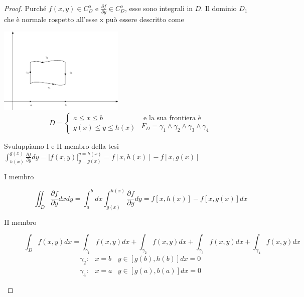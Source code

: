 \begin{proof}
	Purché $f(x,y)\in C_D^o$ e $\frac{\partial f}{\partial y}\in C_D^o$, esse
	sono integrali in $D$. Il dominio $D_1$ che è normale rospetto all'esse x
	può essere descritto come
	\begin{multicols}{2}
		\includegraphics[width=6cm]{img/finiti/secondalegge.eps}\\
		\begin{equation*}
			D=\begin{cases}
				a\leq x\leq b\\
				g(x)\leq y\leq h(x)
			\end{cases}\begin{matrix}
				\text{ e la sua frontiera è}\\
				F_D=\gamma_1\wedge \gamma_2 \wedge \gamma_3 \wedge \gamma_4
			\end{matrix}
		\end{equation*}
	\end{multicols}
	Svuluppiamo I e II membro della tesi $\int_{h(x)}^{g(x)}\frac{\partial
	f}{\partial y} dy=|f(x,y)|^{y=h(x)}_{y=g(x)}=f[x,h(x)]-f[x,g(x)]$
	\begin{description}
		\item[I membro]
			\begin{equation*}
				\iint_D \frac{\partial f}{\partial y} dx dy=\int_{a}^{b} dx
				\int_{g(x)}^{h(x)}\frac{\partial f}{\partial y} dy=
				f[x,h(x)]-f[x,g(x)]dx
			\end{equation*}
		\item[II membro]
			\begin{equation*}
				\int_D f(x, y) dx = \int_{\gamma_1} f(x,y)dx+\int_{\gamma_2}
				f(x,y)dx+\int_{\gamma_3} f(x,y)dx+\int_{\gamma_4} f(x,y)dx
			\end{equation*}
			\begin{equation*}
				\begin{matrix}
					\gamma_2: &x=b& y\in[g(b),h(b)]dx=0\\
					\gamma_4: &x=a& y\in[g(a),b(a)]dx=0
				\end{matrix}
			\end{equation*}

\end{description}
\end{proof}
